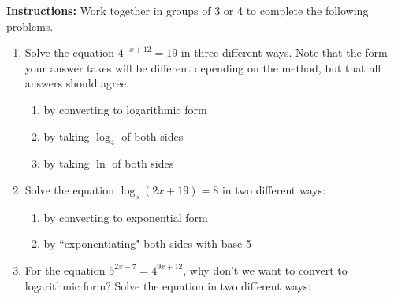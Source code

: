



\noindent \textbf{Instructions:}  Work together in groups of  3 or 4 to complete the following problems.\\


\begin{enumerate}
\item Solve the equation $\displaystyle 4^{-x+12}=19$ in three different ways.  Note that the form your answer takes will be different depending on the method, but that all answers should agree.
\begin{enumerate}
\item by converting to logarithmic form \vfill
\item by taking $\displaystyle \log_4$ of both sides\vfill
\item by taking $\ln$ of both sides\vfill
\end{enumerate}

\newpage
\item Solve the equation $\log_5(2x+19)=8$ in two different ways:
\begin{enumerate}
\item by converting to exponential form\\[1in]
\item by ``exponentiating" both sides with base 5\\[1in]
\end{enumerate}








\item For the equation $5^{2x-7}=4^{9x+12}$, why don't we want to convert to logarithmic form? Solve the equation in two different ways:



\end{enumerate}

